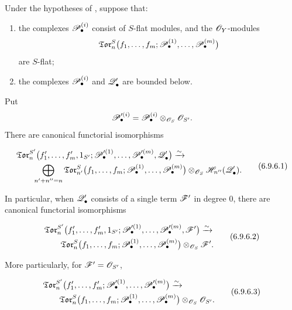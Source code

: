 \begin{corollary}[6.9.6]
\label{III.6.9.6}
Under the hypotheses of , suppose that:
\begin{enumerate}
  \item[$1^\circ$] the complexes $\mathscr{P}_\bullet^{(i)}$ consist of
  $S$-flat modules, and the $\mathscr{O}_Y$-modules
  \[
    \mathfrak{Tor}_n^S
    \bigl(
      f_1,\ldots,f_m;
      \mathscr{P}_\bullet^{(1)},\ldots,\mathscr{P}_\bullet^{(m)}
    \bigr)
  \]
  are $S$-flat;
  \item[$2^\circ$] the complexes $\mathscr{P}_\bullet^{(i)}$ and
  $\mathscr{Q}_\bullet'$ are bounded below.
\end{enumerate}


Put
\[
  \mathscr{P}_\bullet^{\prime(i)}
  =
  \mathscr{P}_\bullet^{(i)}
  \otimes_{\mathscr{O}_S}\mathscr{O}_{S'}.
\]
There are canonical functorial isomorphisms
\begin{env}[6.9.6.1]
\label{III.6.9.6.1}
\[
\begin{split}
  &
  \mathfrak{Tor}_n^{S'}
  \bigl(
    f_1',\ldots,f_m',1_{S'};
    \sh P_\bullet^{\prime(1)},\ldots,
    \sh P_\bullet^{\prime(m)},\sh Q_\bullet'
  \bigr)
  \xrightarrow{\sim}
  \\
  &\qquad
  \bigoplus_{n'+n''=n}
  \mathfrak{Tor}_{n'}^S
  \bigl(
    f_1,\ldots,f_m;
    \sh P_\bullet^{(1)},\ldots,\sh P_\bullet^{(m)}
  \bigr)
  \otimes_{\sh O_S}
  \sh H_{n''}(\sh Q_\bullet').
\end{split}
  \tag{6.9.6.1}\label{III.6.9.6.1.eq}
\]
\end{env}

In particular, when $\mathscr{Q}_\bullet'$ consists of a single term
$\mathscr{F}'$ in degree $0$, there are canonical functorial
isomorphisms
\begin{env}[6.9.6.2]
\label{III.6.9.6.2}
\[
\begin{split}
  &
  \mathfrak{Tor}_n^{S'}
  \bigl(
    f_1',\ldots,f_m',1_{S'};
    \sh P_\bullet^{\prime(1)},\ldots,
    \sh P_\bullet^{\prime(m)},\sh F'
  \bigr)
  \xrightarrow{\sim}
  \\
  &\qquad
  \mathfrak{Tor}_n^S
  \bigl(
    f_1,\ldots,f_m;
    \sh P_\bullet^{(1)},\ldots,\sh P_\bullet^{(m)}
  \bigr)
  \otimes_{\sh O_S}\sh F'.
\end{split}
  \tag{6.9.6.2}\label{III.6.9.6.2.eq}
\]
\end{env}
More particularly, for $\mathscr{F}'=\mathscr{O}_{S'}$,
\begin{env}[6.9.6.3]
\label{III.6.9.6.3}
\[
\begin{split}
  &
  \mathfrak{Tor}_n^{S'}
  \bigl(
    f_1',\ldots,f_m';
    \sh P_\bullet^{\prime(1)},\ldots,
    \sh P_\bullet^{\prime(m)}
  \bigr)
  \xrightarrow{\sim}
  \\
  &\qquad
  \mathfrak{Tor}_n^S
  \bigl(
    f_1,\ldots,f_m;
    \sh P_\bullet^{(1)},\ldots,\sh P_\bullet^{(m)}
  \bigr)
  \otimes_{\sh O_S}\sh O_{S'}.
\end{split}
  \tag{6.9.6.3}\label{III.6.9.6.3.eq}
\]
\end{env}
\end{corollary}

